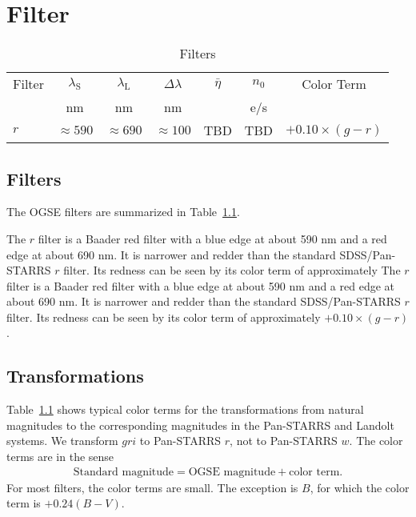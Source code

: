 \chapter{Filter}

\begin{table}
\centering
\caption{Filters}
\medskip
\label{table:filters}
\footnotesize
\begin{tabular}{lcccccl}
\toprule
Filter&$\lambda_\mathrm{S}$&$\lambda_\mathrm{L}$&$\Delta\lambda$&$\bar\eta$&$n_0$&\multicolumn{1}{c}{Color Term}\\
&nm&nm&nm&&\unit{e/s}\\
\midrule
$r$   & $\approx 590$ & $\approx 690$ & $\approx 100$ & TBD & TBD & $+0.10 \times (g-r)$\\
\bottomrule
\end{tabular}
\end{table}


\section{Filters}

The OGSE filters are summarized in Table~\ref{table:filters}.

The $r$ filter is a Baader red filter with a blue edge at about 590 nm and a red edge at about 690 nm. It is narrower and redder than the standard SDSS/Pan-STARRS $r$ filter. Its redness can be seen by its color term of approximately The $r$ filter is a Baader red filter with a blue edge at about 590 nm and a red edge at about 690 nm. It is narrower and redder than the standard SDSS/Pan-STARRS $r$ filter. Its redness can be seen by its color term of approximately $+0.10 \times (g-r)$.


\section{Transformations}

Table~\ref{table:filters} shows typical color terms for the transformations from natural magnitudes to the corresponding magnitudes in the Pan-STARRS and Landolt systems. We transform $gri$ to Pan-STARRS $r$, not to Pan-STARRS $w$. The color terms are in the sense
\begin{align}
\mbox{Standard magnitude} = \mbox{OGSE magnitude} + \mbox{color term}.
\end{align}
For most filters, the color terms are small. The exception is $B$, for which the color term is $+0.24(B-V)$.

